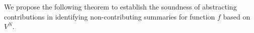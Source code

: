 


We propose the following theorem to establish the soundness of abstracting contributions in identifying non-contributing summaries for function $f$ based on $V^{N}$.

